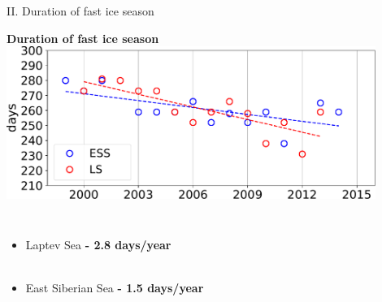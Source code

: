 \documentclass[8pt]{beamer}
\begin{document}
\setwatermark{\fontsize{125pt}{125pt}\selectfont{}}
\begin{frame}[fragile]{II. Duration of fast ice season}
	\begin{center}
		\textbf{Duration of fast ice season}
		\includegraphics[width=0.9\textwidth]{./img/SeasonLength.pdf}
	\end{center}
	\begin{columns}
		\begin{itemize}
			\item Laptev Sea \textbf{- 2.8 days/year}\\~\\
			\item  East Siberian Sea \textbf{- 1.5 days/year}
		\end{itemize}
	\end{columns}


\end{frame}
\end{document}
